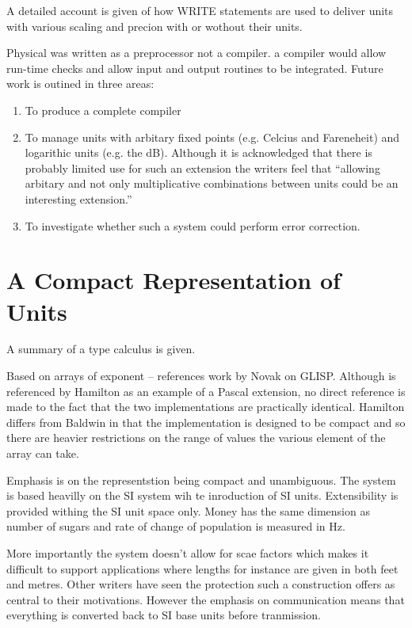 \documentclass[a4paper]{article}
\begin{document}
A detailed account is given of how WRITE statements are used to deliver units 
with various scaling and precion with or wothout their units.

Physical was written as a preprocessor not a compiler.
a compiler would allow run-time checks and allow input and output routines to 
be integrated.
Future work is outined in three areas:
\begin{enumerate}
\item To produce a complete compiler
\item To manage units with arbitary fixed points (e.g. Celcius and Fareneheit) 
and logarithic units (e.g. the dB). Although it is acknowledged that there is 
probably limited use for such an extension the writers feel that ``allowing 
arbitary and not only multiplicative combinations between units could be an 
interesting extension.''
\item To investigate whether such a system could perform error correction.
\end{enumerate}

\section{A Compact Representation of Units \cite{ME_hamilton}}
A summary of a type calculus is given.

Based on arrays of exponent -- references work by Novak on GLISP.
Although \cite{ME_baldwin} is referenced by Hamilton as an example of
a Pascal extension, no direct reference is made to the fact that the two 
implementations are practically identical. Hamilton differs from Baldwin in 
that the implementation is designed to be compact and so there are heavier
restrictions on the range of values the various element of the array can take.

Emphasis is on the representstion being compact and unambiguous. The system is 
based heavilly on the SI system wih te inroduction of SI units. Extensibility 
is provided withing the SI unit space only. Money has the same dimension as 
number of sugars and rate of change of population is measured in Hz.

More importantly the system doesn't allow for scae factors which makes it 
difficult to support applications where lengths for instance are given in both 
feet and metres. Other writers have seen the protection such a construction 
offers as central to their motivations. However the emphasis on communication 
means that everything is converted back to SI base units before tranmission.
\end{document}
